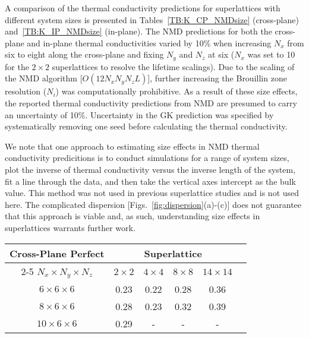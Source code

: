 \documentclass[aps,prb,preprint,preprintnumbers,amsmath,amssymb,floatfix,superscriptaddress]{revtex4}
\begin{document}
A comparison of the thermal conductivity predictions for superlattices with different system sizes is presented in Tables~\ref{TB:K_CP_NMDsize} (cross-plane) and~\ref{TB:K_IP_NMDsize} (in-plane). The NMD predictions for both the cross-plane and in-plane thermal conductivities varied by 10\% when increasing $N_x$ from six to eight along the cross-plane and fixing $N_y$ and $N_z$ at six ($N_x$ was set to 10 for the $2\times2$ superlattices to resolve the lifetime scalings). %
Due to the scaling of the NMD algorithm [$O(12N_xN_yN_z L)$], further increasing the Brouillin zone resolution ($N_i$) was computationally prohibitive. As a result of these size effects, the reported thermal conductivity predictions from NMD are presumed to carry an uncertainty of 10\%. Uncertainty in the GK prediction was specified by systematically removing one seed before calculating the thermal conductivity.

We note that one approach to estimating size effects in NMD thermal conductivity predicitions is to conduct simulations for a range of system sizes, plot the inverse of thermal conductivity versus the inverse length of the system, fit a line through the data, and then take the vertical axes intercept as the bulk value.\cite{PhysRevB.81.214305}  %
This method was not used in previous superlattice studies \cite{doi:10.1021/nl202186y,savic:073113,Luckyanova16112012} and is not used here. The complicated dispersion [Figs.~\ref{fig:dispersion}(a)-(c)] does not guarantee that this approach is viable and, as such, understanding size effects in superlattices warrants further work.

\begin{table*}
\begin{center}
\begin{tabular*}{\textwidth}{c@{\extracolsep{\fill}}ccccc}
\hline\hline\noalign{\smallskip}
Cross-Plane Perfect& \multicolumn{4}{c}{Superlattice} \\
\cline{2-5}\noalign{\smallskip}
$N_x\times N_y \times N_z$ & $2\times2$ & $4\times4$ & $8\times8$ & $14\times14$  \\
\noalign{\smallskip}\hline\noalign{\smallskip}
$6\times6\times6$ & 0.23  & 0.22  &  0.28  &  0.36 \\
$8\times6\times6$ & 0.28  & 0.23  &  0.32  &  0.39 \\
$10\times6\times6$ & 0.29  &  - &  -  &  - \\
\hline\hline
\end{tabular*}
\end{center}
\renewcommand{\table}{Table.}
\caption{Size-dependent cross-plane thermal conductivity NMD predictions [Wm$^{-1}$K$^{-1}$].}
\label{TB:K_CP_NMDsize}
\end{table*}
\end{document}
